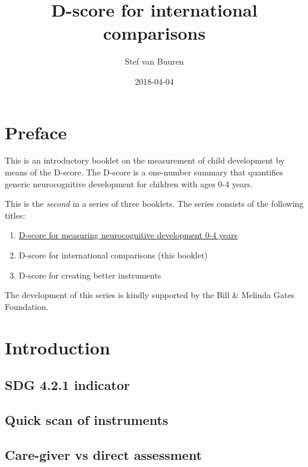 \documentclass[]{book}
\title{D-score for international comparisons}
\author{Stef van Buuren}
\date{2018-04-04}
\providecommand{\tightlist}{%
  \setlength{\itemsep}{0pt}\setlength{\parskip}{0pt}}
\theoremstyle{definition}
\theoremstyle{definition}
\theoremstyle{definition}
\theoremstyle{remark}
\begin{document}
\maketitle

{
\setcounter{tocdepth}{1}
\tableofcontents
}
\chapter*{Preface}\label{preface}

This is an introductory booklet on the measurement of child development
by means of the D-score. The D-score is a one-number summary that
quantifies generic neurocognitive development for children with ages 0-4
years.

This is the \emph{second} in a series of three booklets. The series
consists of the following titles:

\begin{enumerate}
\def\labelenumi{\arabic{enumi}.}
\tightlist
\item
  \href{https://stefvanbuuren.github.io/dbook1/}{D-score for measuring
  neurocognitive development 0-4 years}
\item
  D-score for international comparisons (this booklet)
\item
  D-score for creating better instruments
\end{enumerate}

The development of this series is kindly supported by the Bill \&
Melinda Gates Foundation.

\chapter{Introduction}\label{ch:introduction2}

\section{SDG 4.2.1 indicator}\label{sdg-4.2.1-indicator}

\section{Quick scan of instruments}\label{quick-scan-of-instruments}

\section{Care-giver vs direct
assessment}\label{care-giver-vs-direct-assessment}
\end{document}

